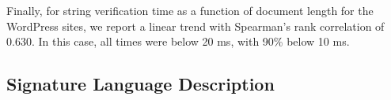 Finally, for string verification time as a function of document length for the WordPress sites, we report a linear trend with  Spearman's rank correlation of 0.630. In this case, all times were below 20 ms, with 90\% below 10 ms.


%	




\subsection{Signature Language Description} \label{appendix:language_specification}

